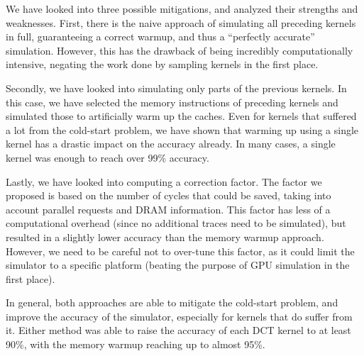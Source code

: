 We have looked into three possible mitigations, and analyzed their strengths and weaknesses.
First, there is the naive approach of simulating all preceding kernels in full, guaranteeing a correct warmup, and thus a ``perfectly accurate'' simulation.
However, this has the drawback of being incredibly computationally intensive, negating the work done by sampling kernels in the first place.

Secondly, we have looked into simulating only parts of the previous kernels.
In this case, we have selected the memory instructions of preceding kernels and simulated those to artificially warm up the caches.
Even for kernels that suffered a lot from the cold-start problem, we have shown that warming up using a single kernel has a drastic impact on the accuracy already.
In many cases, a single kernel was enough to reach over 99\% accuracy.

Lastly, we have looked into computing a correction factor.
The factor we proposed is based on the number of cycles that could be saved, taking into account parallel requests and DRAM information.
This factor has less of a computational overhead (since no additional traces need to be simulated), but resulted in a slightly lower accuracy than the memory warmup approach.
However, we need to be careful not to over-tune this factor, as it could limit the simulator to a specific platform (beating the purpose of GPU simulation in the first place).

In general, both approaches are able to mitigate the cold-start problem, and improve the accuracy of the simulator, especially for kernels that do suffer from it.
Either method was able to raise the accuracy of each DCT kernel to at least 90\%, with the memory warmup reaching up to almost 95\%.